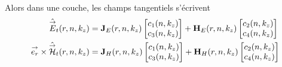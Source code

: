   \begin{prop}
    Alors dans une couche, les champs tangentiels s'écrivent
    \begin{subequations}
      \begin{align}
        \hat {{\overset{\rightarrow}{E}}}_t(r,n,k_z) &= \mathbf{J}_{E}(r,n,k_z)
        \begin{bmatrix}
          c_1(n,k_z) \\
          c_3(n,k_z)
        \end{bmatrix}
        +
        \mathbf{H}_{E}(r,n,k_z)
        \begin{bmatrix}
          c_2(n,k_z) \\
          c_4(n,k_z)
        \end{bmatrix}
        \label{eq:imp_fourier:cylindre:Et}\\
        {\overset{\rightarrow}{e_r}}\times\hat {{\overset{\rightarrow}{\mathcal{H}}}}_t(r,n,k_z) &=
        \mathbf{J}_{H}(r,n,k_z)
        \begin{bmatrix}
          c_1(n,k_z) \\
          c_3(n,k_z)
        \end{bmatrix}
        +
        \mathbf{H}_{H}(r,n,k_z)
        \begin{bmatrix}
          c_2(n,k_z) \\
          c_4(n,k_z)
        \end{bmatrix}
        \label{eq:imp_fourier:cylindre:Ht}
      \end{align}
    \end{subequations}
  \end{prop}


